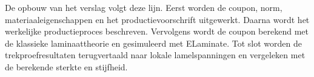 De opbouw van het verslag volgt deze lijn. Eerst worden de coupon, norm,
materiaaleigenschappen en het productievoorschrift uitgewerkt. Daarna wordt het
werkelijke productieproces beschreven. Vervolgens wordt de coupon berekend met
de klassieke laminaattheorie en gesimuleerd met ELaminate. Tot slot worden de
trekproefresultaten terugvertaald naar lokale lamelspanningen en vergeleken met
de berekende sterkte en stijfheid.
